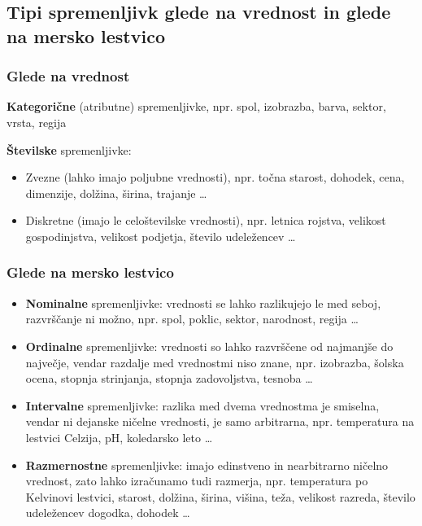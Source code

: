 \subsection*{Tipi spremenljivk glede na vrednost in glede na mersko lestvico}

\subsubsection*{Glede na vrednost}

\textbf{Kategorične} (atributne) spremenljivke, npr. spol, izobrazba, barva, sektor, vrsta, regija

\textbf{Številske} spremenljivke:
\begin{itemize}
\item Zvezne (lahko imajo poljubne vrednosti), npr. točna starost, dohodek, cena, dimenzije, dolžina, širina, trajanje …
\item Diskretne (imajo le celoštevilske vrednosti), npr. letnica rojstva, velikost gospodinjstva, velikost podjetja, število udeležencev …
\end{itemize}

\subsubsection*{Glede na mersko lestvico}
\begin{itemize}
\item \textbf{Nominalne} spremenljivke: vrednosti se lahko razlikujejo le med seboj, razvrščanje ni možno, npr. spol, poklic, sektor, narodnost, regija …
\item \textbf{Ordinalne} spremenljivke: vrednosti so lahko razvrščene od najmanjše do največje, vendar razdalje med vrednostmi niso znane, npr. izobrazba, šolska ocena, stopnja strinjanja, stopnja zadovoljstva, tesnoba …
\item \textbf{Intervalne} spremenljivke: razlika med dvema vrednostma je smiselna, vendar ni dejanske ničelne vrednosti, je samo arbitrarna, npr. temperatura na lestvici Celzija, pH, koledarsko leto …
\item \textbf{Razmernostne} spremenljivke: imajo edinstveno in nearbitrarno ničelno vrednost, zato lahko izračunamo tudi razmerja, npr. temperatura po Kelvinovi lestvici, starost, dolžina, širina, višina, teža, velikost razreda, število udeležencev dogodka, dohodek …
\end{itemize}

